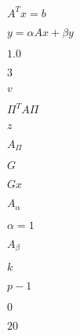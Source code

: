 \documentclass{article}
\begin{document}
\pagebreak


$A^T x = b$


\pagebreak


$y = \alpha A x + \beta y$


\pagebreak


$1.0$


\pagebreak


$3$


\pagebreak


$v$


\pagebreak


$\Pi^T A \Pi$


\pagebreak


$z$


\pagebreak


$A_\Pi$


\pagebreak


$G$


\pagebreak


$Gx$


\pagebreak


$A_\alpha$


\pagebreak


$\alpha=1$


\pagebreak


$A_\beta$


\pagebreak


$k$


\pagebreak


$p-1$


\pagebreak


$0$


\pagebreak


$20$


\pagebreak
\end{document}
